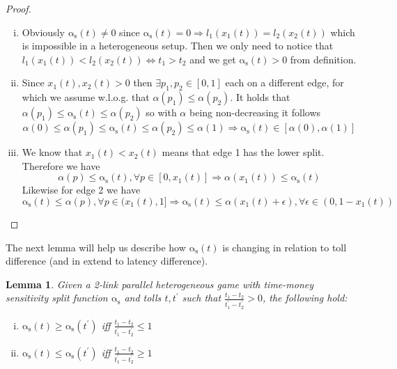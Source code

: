 \documentclass[a4paper,11pt]{article}
\newcommand{\as}{\mathrm{\alpha_s}}
\newtheorem{lemma}{Lemma}[section]
\begin{document}
\begin{proof}
	$ $ %
	\begin{enumerate}[(i)]
		\item Obviously $\as(t) \ne 0$ since $\as(t) = 0 \Rightarrow l_1(x_1(t)) = l_2(x_2(t))$ which is impossible in a heterogeneous setup.
		Then we only need to notice that $l_1(x_1(t)) < l_2(x_2(t)) \iff t_1 > t_2$ and we get $\as(t) > 0$ from definition.
		\item Since $x_1(t), x_2(t) > 0$ then $\exists p_1, p_2 \in [0, 1]$ each on a different edge, for which we assume w.l.o.g. that $\alpha(p_1) \le \alpha(p_2)$.
		It holds that $\alpha(p_1) \le \as(t) \le \alpha(p_2)$ so with $\alpha$ being non-decreasing it follows
		\[\alpha(0) \le \alpha(p_1) \le \as(t) \le \alpha(p_2) \le \alpha(1) \Rightarrow \as(t) \in [\alpha(0), \alpha(1)]\]
		\item We know that $x_1(t) < x_2(t)$ means that edge 1 has the lower split.
		Therefore we have
		\[\alpha(p) \le \as(t), \forall p \in [0, x_1(t)] \Rightarrow \alpha(x_1(t)) \le \as(t)\]
		Likewise for edge 2 we have
		\[\as(t) \le \alpha(p), \forall p \in (x_1(t), 1] \Rightarrow \as(t) \le \alpha(x_1(t) + \epsilon), \forall \epsilon \in (0, 1 - x_1(t))\]
	\end{enumerate}
\end{proof}

The next lemma will help us describe how $\as(t)$ is changing in relation to toll difference (and in extend to latency difference).
\begin{lemma}
	Given a 2-link parallel heterogeneous game with time-money sensitivity split function $\as$ and tolls $t, t^\prime$ such that $\frac{t_1 - t_2}{t_1^\prime - t_2^\prime} > 0$, the following hold:
	\begin{enumerate}[(i)]
		\item $\as(t) \ge \as(t^\prime)$ iff $\frac{t_1 - t_2}{t_1^\prime - t_2^\prime} \le 1$
		\item $\as(t) \le \as(t^\prime)$ iff $\frac{t_1 - t_2}{t_1^\prime - t_2^\prime} \ge 1$
	\end{enumerate}
\end{lemma}
\end{document}
